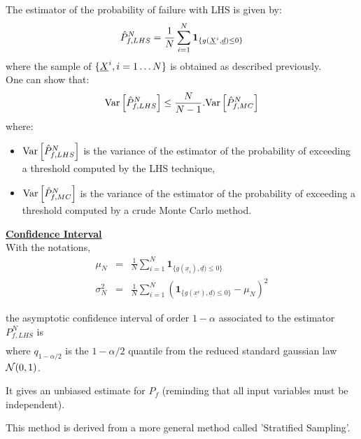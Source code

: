 {  The estimator of the probability of failure with LHS is given by:
  \begin{align*}
    \hat{P}_{f,LHS}^N = \frac{1}{N}\sum_{i=1}^N \mathbf{1}_{\{g(\underline{X}^i,\underline{d}) \leq 0 \}}
  \end{align*}
  where the sample of $ \{ \underline{X}^i,i=1 \hdots N \}$ is obtained as described previously.\\
  One can show that:
  \begin{align*}
    {\rm Var}\left[ \hat{P}_{f,LHS}^N \right] \leq \frac{N}{N-1} . {\rm Var}\left[     \hat{P}_{f,MC}^N \right]
  \end{align*}
  where:
  \begin{itemize}
  \item ${\rm Var}\left[ \hat{P}_{f,LHS}^N \right]$ is the variance of the estimator of the probability of exceeding a threshold computed by the LHS technique,
  \item ${\rm Var}\left[ \hat{P}_{f,MC}^N \right]$ is the variance of the estimator of the probability of exceeding a threshold computed by a crude Monte Carlo method.
  \end{itemize}


  \underline{\textbf{Confidence Interval}}\\
  With the notations,
  \begin{eqnarray*}
    \mu_N &=& \frac{1}{N}\sum_{i=1}^N \mathbf{1}_{\{g(\underline{x}_i),\underline{d}) \leq 0 \}}\\
    \sigma_N^2 &=& \frac{1}{N}\sum_{i=1}^N (\mathbf{1}_{\{g(\underline{x}^i),\underline{d}) \leq 0 \}} - \mu_N)^2
  \end{eqnarray*}

  the asymptotic confidence interval of order $1-\alpha$ associated to the estimator $P_{f,LHS}^N$ is
  \begin{align*}
    [ \mu_N - \frac{q_{1-\alpha / 2} . \sigma_N}{\sqrt{N}} \space ; \space \mu_N + \frac{q_{1-\alpha / 2} . \sigma_N}{\sqrt{N}} ]
  \end{align*}
  where $q_{1-\alpha /2}$ is the $1-\alpha / 2$ quantile from the reduced standard gaussian law ${\mathcal N}(0,1)$.

  It gives an unbiased estimate for $P_f$ (reminding that all input variables must be independent).

}
{

  This method is derived from a more general method called 'Stratified Sampling'.
}

